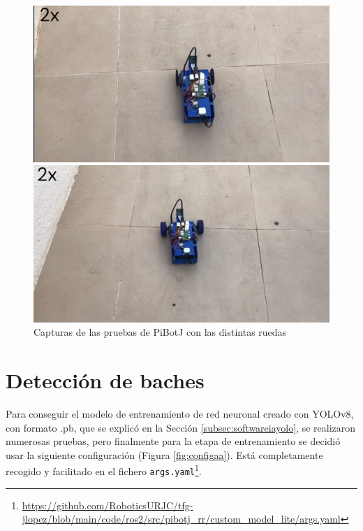 \begin{figure}[ht!]
	\centering
	\begin{minipage}{0.45\linewidth}
		\centering
		\includegraphics[width=\linewidth]{figs/cap7/pruebanegra.png}
	\end{minipage}
	\hspace{1cm}
	\begin{minipage}{0.45\linewidth}
		\centering
		\includegraphics[width=\linewidth]{figs/cap7/pruebaazul.png}
	\end{minipage}
	\caption{Capturas de las pruebas de PiBotJ con las distintas ruedas}
	\label{fig:pruebaruedas}
\end{figure}


\section{Detección de baches}
\label{sec:expaa}

Para conseguir el modelo de entrenamiento de red neuronal creado con YOLOv8, con formato .pb, que se explicó en la Sección \ref{subsec:softwareiayolo}, se realizaron numerosas pruebas, pero finalmente para la etapa de entrenamiento se decidió usar la siguiente configuración (Figura \ref{fig:configaa}). Está completamente recogido y facilitado en el fichero \verb|args.yaml|\footnote{\url{https://github.com/RoboticsURJC/tfg-jlopez/blob/main/code/ros2/src/pibotj_rr/custom_model_lite/args.yaml}}.

